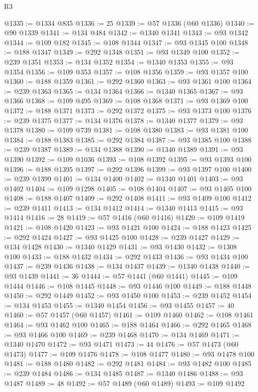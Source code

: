 \begin{lexlean}{R3}
\begin{coremodule}
@1335 := @1334 @835
@1336 := 25
@1339 := @57 @1336 (@60 @1336)
@1340 := @90 @1339
@1341 := @134 @484
@1342 := @1340 @1341
@1343 := @93 @1342
@1344 := @109 @182
@1345 := @108 @1344
@1347 := @93 @1345 @100
@1348 := @188 @1347
@1349 := @292 @1348
@1351 := @93 @1349 @100
@1352 := @239 @1351
@1353 := @134 @1352
@1354 := @1340 @1353
@1355 := @93 @1354
@1356 := @109 @353
@1357 := @108 @1356
@1359 := @93 @1357 @100
@1360 := @188 @1359
@1361 := @292 @1360
@1363 := @93 @1361 @100
@1364 := @239 @1363
@1365 := @134 @1364
@1366 := @1340 @1365
@1367 := @93 @1366
@1368 := @109 @495
@1369 := @108 @1368
@1371 := @93 @1369 @100
@1372 := @188 @1371
@1373 := @292 @1372
@1375 := @93 @1373 @100
@1376 := @239 @1375
@1377 := @134 @1376
@1378 := @1340 @1377
@1379 := @93 @1378
@1380 := @109 @739
@1381 := @108 @1380
@1383 := @93 @1381 @100
@1384 := @188 @1383
@1385 := @292 @1384
@1387 := @93 @1385 @100
@1388 := @239 @1387
@1389 := @134 @1388
@1390 := @1340 @1389
@1391 := @93 @1390
@1392 := @109 @1036
@1393 := @108 @1392
@1395 := @93 @1393 @100
@1396 := @188 @1395
@1397 := @292 @1396
@1399 := @93 @1397 @100
@1400 := @239 @1399
@1401 := @134 @1400
@1402 := @1340 @1401
@1403 := @93 @1402
@1404 := @109 @1298
@1405 := @108 @1404
@1407 := @93 @1405 @100
@1408 := @188 @1407
@1409 := @292 @1408
@1411 := @93 @1409 @100
@1412 := @239 @1411
@1413 := @134 @1412
@1414 := @1340 @1413
@1415 := @93 @1414
@1416 := 28
@1419 := @57 @1416 (@60 @1416)
@1420 := @109 @1419
@1421 := @108 @1420
@1423 := @93 @1421 @100
@1424 := @188 @1423
@1425 := @292 @1424
@1427 := @93 @1425 @100
@1428 := @239 @1427
@1429 := @134 @1428
@1430 := @1340 @1429
@1431 := @93 @1430
@1432 := @1308 @100
@1433 := @188 @1432
@1434 := @292 @1433
@1436 := @93 @1434 @100
@1437 := @239 @1436
@1438 := @134 @1437
@1439 := @1340 @1438
@1440 := @93 @1439
@1441 := 36
@1444 := @57 @1441 (@60 @1441)
@1445 := @109 @1444
@1446 := @108 @1445
@1448 := @93 @1446 @100
@1449 := @188 @1448
@1450 := @292 @1449
@1452 := @93 @1450 @100
@1453 := @239 @1452
@1454 := @134 @1453
@1455 := @1340 @1454
@1456 := @93 @1455
@1457 := 40
@1460 := @57 @1457 (@60 @1457)
@1461 := @109 @1460
@1462 := @108 @1461
@1464 := @93 @1462 @100
@1465 := @188 @1464
@1466 := @292 @1465
@1468 := @93 @1466 @100
@1469 := @239 @1468
@1470 := @134 @1469
@1471 := @1340 @1470
@1472 := @93 @1471
@1473 := 44
@1476 := @57 @1473 (@60 @1473)
@1477 := @109 @1476
@1478 := @108 @1477
@1480 := @93 @1478 @100
@1481 := @188 @1480
@1482 := @292 @1481
@1484 := @93 @1482 @100
@1485 := @239 @1484
@1486 := @134 @1485
@1487 := @1340 @1486
@1488 := @93 @1487
@1489 := 48
@1492 := @57 @1489 (@60 @1489)
@1493 := @109 @1492

\end{coremodule}
\end{lexlean}
